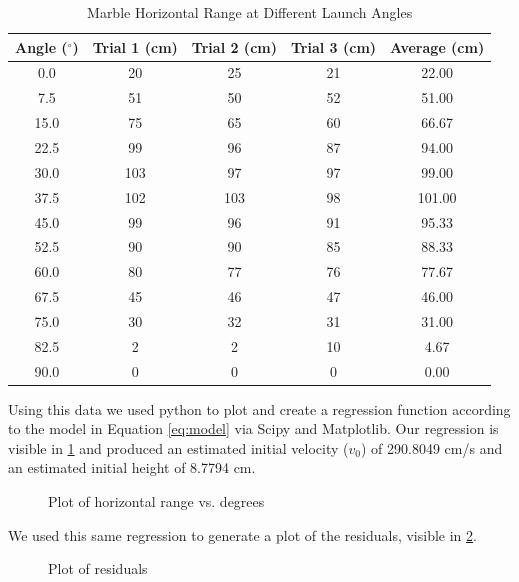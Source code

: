 \documentclass[amsmath,amssymb,aps,endfloats,linenumbers]{revtex4-2}
\begin{document}
\begin{table}[htbp]
    \centering
    \caption{Marble Horizontal Range at Different Launch Angles}
    \label{tab:projectile-distance}
    \begin{tabular}{ccccc}
        \toprule
        Angle ($^\circ$) &
        Trial 1 (cm) &
        Trial 2 (cm) &
        Trial 3 (cm) &
        Average (cm) \\
        \midrule
        0.0  & 20  & 25  & 21  & 22.00 \\
        7.5  & 51  & 50  & 52  & 51.00 \\
        15.0 & 75  & 65  & 60  & 66.67 \\
        22.5 & 99  & 96  & 87  & 94.00 \\
        30.0 & 103 & 97  & 97  & 99.00 \\
        37.5 & 102 & 103 & 98  & 101.00 \\
        45.0 & 99  & 96  & 91  & 95.33 \\
        52.5 & 90  & 90  & 85  & 88.33 \\
        60.0 & 80  & 77  & 76  & 77.67 \\
        67.5 & 45  & 46  & 47  & 46.00 \\
        75.0 & 30  & 32  & 31  & 31.00 \\
        82.5 & 2   & 2   & 10  & 4.67 \\
        90.0 & 0   & 0   & 0   & 0.00 \\
        \bottomrule
    \end{tabular}
\end{table}

Using this data we used python to plot and create a regression function according to the model in Equation \cref{eq:model} via Scipy and Matplotlib\cite{scipy,matplotlib}.
Our regression is visible in \cref{fig:regression} and produced an estimated initial velocity ($v_0$) of 290.8049 cm/s and an estimated initial height of 8.7794 cm.
\begin{figure}
  \centering
    
    \caption{Plot of horizontal range vs. degrees}
    \label{fig:regression}
\end{figure}

We used this same regression to generate a plot of the residuals, visible in \cref{fig:residual}.
\begin{figure}
  \centering
    
    \caption{Plot of residuals}
    \label{fig:residual}
\end{figure}
\end{document}
